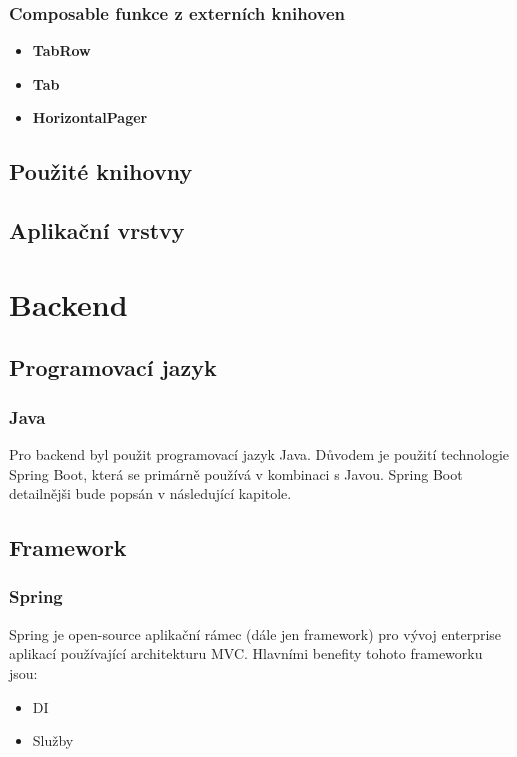 \subsubsection*{Composable funkce z externích knihoven}


\begin{itemize}
	\item \textbf{TabRow}
	\item \textbf{Tab}
	\item \textbf{HorizontalPager}
\end{itemize}

\subsection {Použité knihovny}

\subsection {Aplikační vrstvy}




\section{Backend}

\subsection {Programovací jazyk}

\subsubsection *{Java}
Pro backend byl použit programovací jazyk Java. Důvodem je použití technologie Spring Boot, která se primárně používá v kombinaci s Javou. Spring Boot detailnějši bude popsán v následující kapitole.

\subsection {Framework}

\subsubsection *{Spring}
Spring je open-source aplikační rámec (dále jen framework) pro vývoj enterprise aplikací používající architekturu MVC. Hlavními benefity tohoto frameworku jsou:

\begin{itemize}
	\item DI
	\item Služby
\end{itemize}

